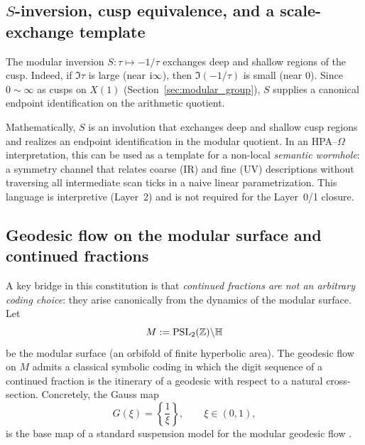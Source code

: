 \subsection{\texorpdfstring{$S$}{S}-inversion, cusp equivalence, and a scale-exchange template}
\label{sec:S_inversion}

The modular inversion $S:\tau\mapsto -1/\tau$ exchanges deep and shallow regions of the cusp. Indeed, if $\Im\tau$ is large (near $\mathrm{i}\infty$), then $\Im(-1/\tau)$ is small (near $0$). Since $0\sim\infty$ as cusps on $X(1)$ (Section~\ref{sec:modular_group}), $S$ supplies a canonical endpoint identification on the arithmetic quotient.

\begin{remark}
Mathematically, $S$ is an involution that exchanges deep and shallow cusp regions and realizes an endpoint identification in the modular quotient. In an HPA--$\Omega$ interpretation, this can be used as a template for a non-local \emph{semantic wormhole}: a symmetry channel that relates coarse (IR) and fine (UV) descriptions without traversing all intermediate scan ticks in a naive linear parametrization. This language is interpretive (Layer~2) and is not required for the Layer~0/1 closure.
\end{remark}

\subsection{Geodesic flow on the modular surface and continued fractions}
\label{sec:modular_geodesic_cf}

A key bridge in this constitution is that \emph{continued fractions are not an arbitrary coding choice}: they arise canonically from the dynamics of the modular surface. Let
\begin{equation}
M := \mathrm{PSL}_2(\mathbb{Z})\backslash \mathbb{H}
\end{equation}
be the modular surface (an orbifold of finite hyperbolic area). The geodesic flow on $M$ admits a classical symbolic coding in which the digit sequence of a continued fraction is the itinerary of a geodesic with respect to a natural cross-section. Concretely, the Gauss map
\begin{equation}
G(\xi) = \left\{\frac{1}{\xi}\right\},\qquad \xi\in(0,1),
\end{equation}
is the base map of a standard suspension model for the modular geodesic flow \cite{Series1985,KatokHasselblatt1995}.

